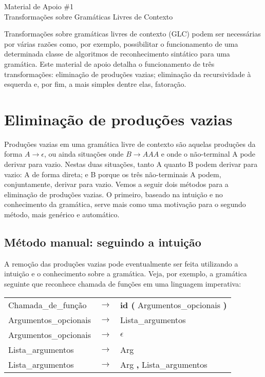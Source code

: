 \documentclass{compiladores}
\renewcommand{\flecha}{\rightarrow}
\newcommand{\flech}{$\rightarrow$}
\begin{document}
\begin{center}
{\LARGE Material de Apoio \#1} \\
Transformações sobre Gramáticas Livres de Contexto
\end{center}

Transformações sobre gramáticas livres de contexto (GLC) podem ser
necessárias por várias razões como, por exemplo, possibilitar o
funcionamento de uma determinada classe de algoritmos de
reconhecimento sintático para uma gramática. Este material de apoio
detalha o funcionamento de três transformações: eliminação de
produções vazias; eliminação da recursividade à esquerda e, por fim, a
mais simples dentre elas, fatoração.

\section{Eliminação de produções vazias}

Produções vazias em uma gramática livre de contexto são aquelas
produções da forma $A \flecha \epsilon$, ou ainda situações onde $B
\flecha AAA$ e onde o não-terminal A pode derivar para vazio. Nestas
duas situações, tanto A quanto B podem derivar para vazio: A de forma
direta; e B porque os três não-terminais A podem, conjuntamente,
derivar para vazio. Vemos a seguir dois métodos para a eliminação de
produções vazias. O primeiro, baseado na intuição e no conhecimento da
gramática, serve mais como uma motivação para o segundo método, mais
genérico e automático.

\subsection{Método manual: seguindo a intuição}


A remoção das produções vazias pode eventualmente ser feita utilizando
a intuição e o conhecimento sobre a gramática. Veja, por exemplo, a
gramática seguinte que reconhece chamada de funções em uma linguagem
imperativa:

\begin{center}
\begin{tabular}{lll}
Chamada\_de\_função   & \flech & {\bf id (} Argumentos\_opcionais {\bf )}\\
Argumentos\_opcionais & \flech & Lista\_argumentos \\
Argumentos\_opcionais & \flech & $\epsilon$ \\
Lista\_argumentos     & \flech & Arg \\
Lista\_argumentos     & \flech & Arg {\bf ,} Lista\_argumentos \\
\end{tabular}
\end{center}
\end{document}
